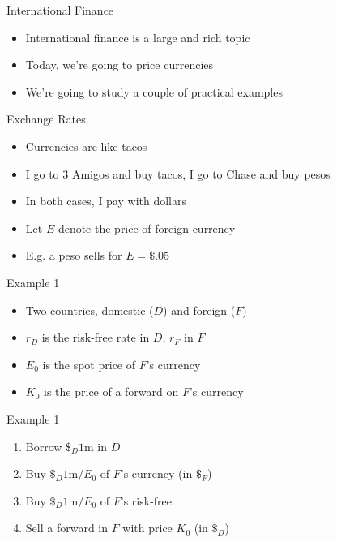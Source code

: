 \documentclass{beamer}
\begin{document}
\begin{frame}{International Finance}
   \begin{itemize}
       \item International finance is a large and rich topic
       \item Today, we're going to price currencies
       \item We're going to study a couple of practical examples
   \end{itemize}
\end{frame}

\begin{frame}{Exchange Rates}
    \begin{itemize}
        \item Currencies are like tacos
        \item I go to 3 Amigos and buy tacos, I go to Chase and buy pesos
        \item In both cases, I pay with dollars
        \item Let $E$ denote the price of foreign currency
        \item E.g. a peso sells for $E=\$.05$ 
    \end{itemize}
\end{frame}

\begin{frame}{Example 1}
    \begin{itemize}
        \item Two countries, domestic ($D$) and foreign ($F$)
        \item $r_{D}$ is the risk-free rate in $D$, $r_{F}$ in $F$
        \item $E_{0}$ is the spot price of $F$'s currency
        \item $K_{0}$ is the price of a forward on $F$'s currency
    \end{itemize}
\end{frame}

\begin{frame}{Example 1}
    \begin{enumerate}
        \item Borrow $\$_{D}1$m in $D$
        \item Buy $\$_{D}1\text{m}/E_{0}$ of $F$'s currency (in $\$_{F}$)
        \item Buy $\$_{D}1\text{m}/E_{0}$ of $F$'s risk-free 
        \item Sell a forward in $F$ with price $K_{0}$ (in $\$_{D}$)
    \end{enumerate}
\end{frame}
\end{document}
